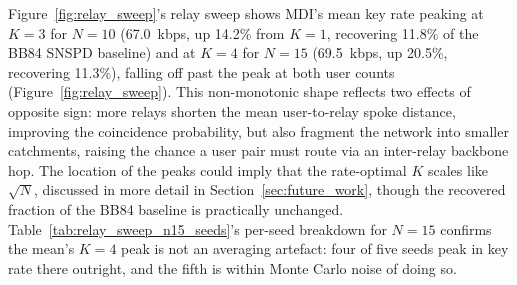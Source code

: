 \documentclass[12pt]{article}
\begin{document}
Figure~\ref{fig:relay_sweep}'s relay sweep shows MDI's mean key rate peaking at $K=3$ for $N=10$ (67.0~kbps, up 14.2\% from $K=1$, recovering 11.8\% of the BB84 SNSPD baseline) and at $K=4$ for $N=15$ (69.5~kbps, up 20.5\%, recovering 11.3\%), falling off past the peak at both user counts (Figure~\ref{fig:relay_sweep}). This non-monotonic shape reflects two effects of opposite sign: more relays shorten the mean user-to-relay spoke distance, improving the coincidence probability, but also fragment the network into smaller catchments, raising the chance a user pair must route via an inter-relay backbone hop. The location of the peaks could imply that the rate-optimal $K$ scales like $\sqrt{N}$, discussed in more detail in Section~\ref{sec:future_work}, though the recovered fraction of the BB84 baseline is practically unchanged. Table~\ref{tab:relay_sweep_n15_seeds}'s per-seed breakdown for $N=15$ confirms the mean's $K=4$ peak is not an averaging artefact: four of five seeds peak in key rate there outright, and the fifth is within Monte Carlo noise of doing so.
\end{document}
